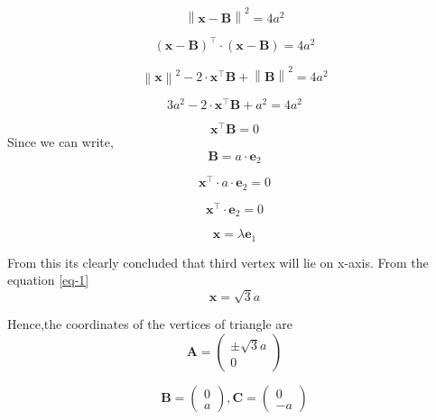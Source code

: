 \documentclass[journal,12pt,twocolumn]{IEEEtran}
\providecommand{\norm}[1]{\left\lVert#1\right\rVert}
\let\vec\mathbf
\providecommand{\brak}[1]{\ensuremath{\left(#1\right)}}
\begin{document}
\begin{equation}
\norm{\vec{x}-\vec{B}}^2 = 4a^2
\end{equation}

\begin{equation}
\brak{\vec{x} -\vec{B}}^{\top} \cdot \brak{\vec{x}-\vec{B}} = 4a^2
\end{equation}

\begin{equation}
\norm{\vec{x}}^2-2\cdot \vec{x}^\top \vec{B} + \norm{\vec{B}}^2 = 4a^2
\end{equation}

\begin{equation}
3a^2 - 2\cdot \vec{x}^\top \vec{B} + a^2 = 4a^2
\end{equation}

\begin{equation}
\vec{x}^\top \vec{B} = 0
\end{equation}
\noindent Since we can write, \begin{equation}
\vec{B} = a \cdot \vec{e}_2
\end{equation}

\begin{equation}
\vec{x}^\top \cdot a \cdot \vec{e}_2 = 0
\end{equation}

\begin{equation}
\vec{x}^\top \cdot \vec{e}_2 = 0
\end{equation}

\begin{equation}
\vec{x} = \lambda \vec{e}_1
\end{equation}

\noindent From this its clearly concluded that third vertex will lie on x-axis. 
\noindent From the equation \eqref{eq-1} 
\begin{equation}
\vec{x} = \sqrt{3}{a}
\end{equation}


\noindent Hence,the coordinates of the vertices of triangle are 
  \begin{equation*}
\vec{A} = 
   \begin{pmatrix}
   \pm\sqrt{3}a \\ 0
 \end{pmatrix}
 \end{equation*}

\begin{equation}
\vec{B}=\begin{pmatrix} 
0\\
a
\end{pmatrix}, {
\vec{C}=\begin{pmatrix} 
0\\
-a
\end{pmatrix} }
\end{equation}
\end{document}
